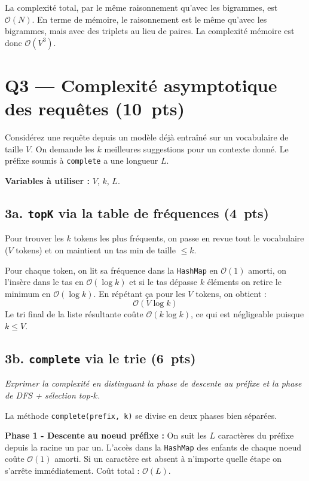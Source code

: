 \documentclass[12pt,a4paper]{article}
\newcommand{\jclass}[1]{\texttt{#1}}
\newcommand{\pts}[1]{\hfill\textbf{\small(#1~pts)}}
\newcommand{\bigo}[1]{$\mathcal{O}(#1)$}
\begin{document}
{{La complexité total, par le même raisonnement qu'avec les bigrammes, est \bigo{N}.
En terme de mémoire, le raisonnement est le même qu'avec les bigrammes, mais avec des triplets au lieu de paires.
La complexité mémoire est donc \bigo{V^3}.

\section{Q3 — Complexité asymptotique des requêtes \pts{10}}

Considérez une requête depuis un modèle déjà entraîné sur un vocabulaire de
taille $V$. On demande les $k$ meilleures suggestions pour un contexte donné.
Le préfixe soumis à \texttt{complete} a une longueur $L$.

\textbf{Variables à utiliser :} $V$, $k$, $L$.

\subsection*{3a. \texttt{topK} via la table de fréquences \pts{4}}

Pour trouver les $k$ tokens les plus fréquents, on passe en revue tout le vocabulaire
($V$ tokens) et on maintient un tas min de taille $\leq k$.

Pour chaque token, on lit sa fréquence dans la \jclass{HashMap} en \bigo{1} amorti, on
l'insère dans le tas en \bigo{\log k} et si le tas dépasse $k$ éléments on retire le
minimum en \bigo{\log k}. En répétant ça pour les $V$ tokens, on obtient :
\[\mathcal{O}(V \log k)\]
Le tri final de la liste résultante coûte \bigo{k \log k}, ce qui est négligeable
puisque $k \leq V$.

\subsection*{3b. \texttt{complete} via le trie \pts{6}}

\textit{Exprimer la complexité en distinguant la phase de descente au préfixe
et la phase de DFS + sélection top-$k$.}

La méthode \texttt{complete(prefix, k)} se divise en deux phases bien séparées.

\textbf{Phase 1 - Descente au noeud préfixe :}
On suit les $L$ caractères du préfixe depuis la racine un par un. L'accès dans la
\jclass{HashMap} des enfants de chaque noeud coûte \bigo{1} amorti. Si un caractère est
absent à n'importe quelle étape on s'arrête immédiatement. Coût total : \bigo{L}.

}}
\end{document}
